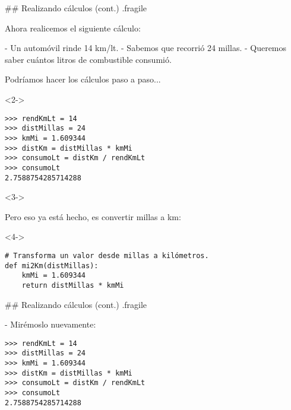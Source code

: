 ## Realizando cálculos (cont.) {.fragile}

Ahora realicemos el siguiente cálculo:

- Un automóvil rinde 14 km/lt.
- Sabemos que recorrió 24 millas.
- Queremos saber cuántos litros de combustible consumió.

\vspace{-.6ex}
\bgnblocknormal
Podríamos hacer los cálculos paso a paso...
\trmblocknormal

\begin{onlyenv}<2->

\bgncolumns
{}

\begin{lstlisting}[linebackgroundcolor={%
        \btLstHL<3->{3-4}%
}]
>>> rendKmLt = 14
>>> distMillas = 24
>>> kmMi = 1.609344
>>> distKm = distMillas * kmMi
>>> consumoLt = distKm / rendKmLt
>>> consumoLt
2.7588754285714288
\end{lstlisting}


<3->

\bgnblockalert
\footnotesize Pero eso ya está hecho, es convertir millas a km:
\trmblockalert

\begin{onlyenv}<4->
\begin{lstlisting}[linebackgroundcolor={%
        \btLstHL<4->{2-4}%
}]
# Transforma un valor desde millas a kilómetros.
def mi2Km(distMillas):
	kmMi = 1.609344
	return distMillas * kmMi
\end{lstlisting}
\end{onlyenv}

\trmcolumns

\end{onlyenv}


## Realizando cálculos (cont.) {.fragile}

- Mirémoslo nuevamente:

\vspace{-2ex}

\bgncolumns
{}
\begin{lstlisting}[linebackgroundcolor={%
        \btLstHL{3-4}%
}]
>>> rendKmLt = 14
>>> distMillas = 24
>>> kmMi = 1.609344
>>> distKm = distMillas * kmMi
>>> consumoLt = distKm / rendKmLt
>>> consumoLt
2.7588754285714288
\end{lstlisting}

